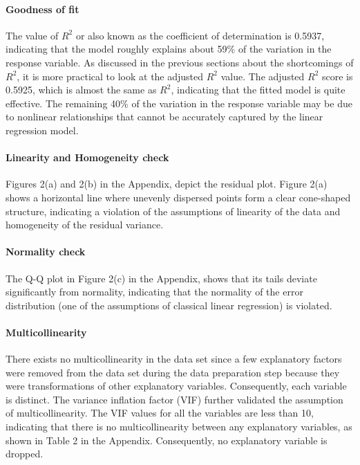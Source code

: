 \documentclass[12 pt]{scrartcl}
\begin{document}
\paragraph{Goodness of fit}
The value of ${R^2}$ or also known as the coefficient of determination is 0.5937, indicating that the model roughly explains about 59\% of the variation in the response variable. As discussed in the previous sections about the shortcomings of ${R^2}$, it is more practical to look at the adjusted ${R^2}$ value. The adjusted ${R^2}$ score is 0.5925, which is almost the same as ${R^2}$, indicating that the fitted model is quite effective. The remaining 40\% of the variation in the response variable may be due to nonlinear relationships that cannot be accurately captured by the linear regression model.


\paragraph{Linearity and Homogeneity check}
Figures 2(a) and 2(b) in the Appendix, depict the residual plot. Figure 2(a) shows a horizontal line where unevenly dispersed points form a clear cone-shaped structure, indicating a violation of the assumptions of linearity of the data and homogeneity of the residual variance.

\paragraph{Normality check}
The Q-Q plot in Figure 2(c) in the Appendix, shows that its tails deviate significantly from normality, indicating that the normality of the error distribution (one of the assumptions of classical linear regression) is violated.


\paragraph{Multicollinearity}
There exists no multicollinearity in the data set since a few explanatory factors were removed from the data set during the data preparation step because they were transformations of other explanatory variables. Consequently, each variable is distinct. The variance inflation factor (VIF) further validated the assumption of multicollinearity. The VIF values for all the variables are less than 10, indicating that there is no multicollinearity between any explanatory variables, as shown in Table 2 in the Appendix. Consequently, no explanatory variable is dropped.
\newpage
\end{document}
